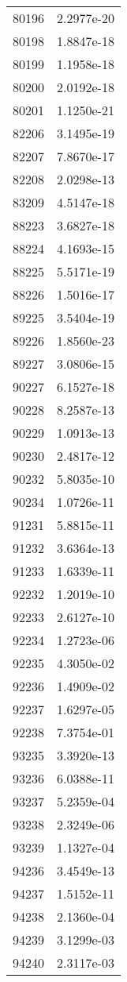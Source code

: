 \begin{table}[h!]
\begin{tabular}{|| c || c |}
80196 & 2.2977e-20 \\
80198 & 1.8847e-18 \\
80199 & 1.1958e-18 \\
80200 & 2.0192e-18 \\
80201 & 1.1250e-21 \\
82206 & 3.1495e-19 \\
82207 & 7.8670e-17 \\
82208 & 2.0298e-13 \\
83209 & 4.5147e-18 \\
88223 & 3.6827e-18 \\
88224 & 4.1693e-15 \\
88225 & 5.5171e-19 \\
88226 & 1.5016e-17 \\
89225 & 3.5404e-19 \\
89226 & 1.8560e-23 \\
89227 & 3.0806e-15 \\
90227 & 6.1527e-18 \\
90228 & 8.2587e-13 \\
90229 & 1.0913e-13 \\
90230 & 2.4817e-12 \\
90232 & 5.8035e-10 \\
90234 & 1.0726e-11 \\
91231 & 5.8815e-11 \\
91232 & 3.6364e-13 \\
91233 & 1.6339e-11 \\
92232 & 1.2019e-10 \\
92233 & 2.6127e-10 \\
92234 & 1.2723e-06 \\
92235 & 4.3050e-02 \\
92236 & 1.4909e-02 \\
92237 & 1.6297e-05 \\
92238 & 7.3754e-01 \\
93235 & 3.3920e-13 \\
93236 & 6.0388e-11 \\
93237 & 5.2359e-04 \\
93238 & 2.3249e-06 \\
93239 & 1.1327e-04 \\
94236 & 3.4549e-13 \\
94237 & 1.5152e-11 \\
94238 & 2.1360e-04 \\
94239 & 3.1299e-03 \\
94240 & 2.3117e-03 \\

\end{tabular}
\end{table}
